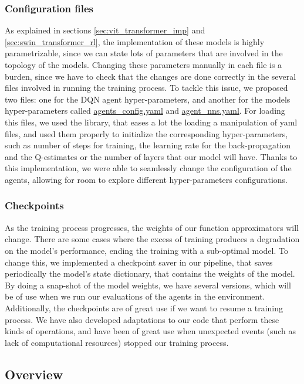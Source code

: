 \subsubsection{Configuration files}
As explained in sections \ref{sec:vit_transformer_imp} and \ref{sec:swin_transformer_rl}, the implementation of these models is highly parametrizable, since we can state lots of parameters that are involved in the topology of the models. Changing these parameters manually in each file is a burden, since we have to check that the changes are done correctly in the several files involved in running the training process. To tackle this issue, we proposed two files: one for the DQN agent hyper-parameters, and another for the models hyper-parameters called \href{https://github.com/Javimh18/DL_TFM/blob/main/config/agents_config.yaml}{agents\_config.yaml} and \href{https://github.com/Javimh18/DL_TFM/blob/main/config/agent_nns.yaml}{agent\_nns.yaml}.
For loading this files, we used the  library, that eases a lot the loading a manipulation of yaml files, and used them properly to initialize the corresponding hyper-parameters, such as number of steps for training, the learning rate for the back-propagation and the Q-estimates or the number of layers that our model will have. Thanks to this implementation, we were able to seamlessly change the configuration of the agents, allowing for room to explore different hyper-parameters configurations.

\subsubsection{Checkpoints}
As the training process progresses, the weights of our function approximators will change. There are some cases where the excess of training produces a degradation on the model's performance, ending the training with a sub-optimal model. To change this, we implemented a checkpoint saver in our pipeline, that saves periodically the model's state dictionary, that contains the weights of the model. By doing a snap-shot of the model weights, we have several versions, which will be of use when we run our evaluations of the agents in the environment. Additionally, the checkpoints are of great use if we want to resume a training process. We have also developed adaptations to our code that perform these kinds of operations, and have been of great use when unexpected events (such as lack of computational resources) stopped our training process.

\subsection{Overview}
\label{sec:overview_implementation}


